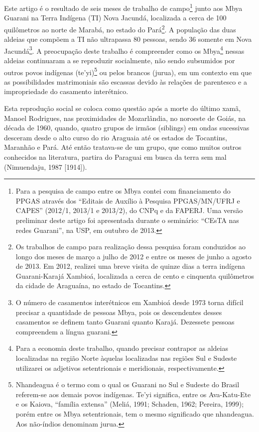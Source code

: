 \documentclass{article}
\begin{document}
Este artigo \'e o resultado de seis meses de trabalho de campo\footnote{
Para a pesquisa de campo entre os Mbya contei com financiamento do
PPGAS atrav\'es dos {\textquotedblleft}Editais de Aux\'ilio \`a
Pesquisa PPGAS/MN/UFRJ e CAPES{\textquotedblright} (2012/1, 2013/1 e
2013/2), do CNPq e da FAPERJ. Uma vers\~ao preliminar deste artigo foi
apresentada durante o semin\'ario: {\textquotedblleft}CEsTA nas redes
Guarani{\textquotedblright}, na USP, em outubro de 2013.} junto aos
Mbya Guarani na Terra Ind\'igena (TI) Nova Jacund\'a, localizada a
cerca de 100 quil\^ometros ao norte de Marab\'a, no estado do
Par\'a\footnote{ Os trabalhos de campo para realiza\c{c}\~ao dessa
pesquisa foram conduzidos ao longo dos meses de mar\c{c}o a julho de
2012 e entre os meses de junho a agosto de 2013. Em 2012, realizei uma
breve visita de quinze dias a terra ind\'igena Guarani-Karaj\'a
Xambio\'a, localizada a cerca de cento e cinquenta quil\^ometros da
cidade de Aragua\'ina, no estado de Tocantins.}. A popula\c{c}\~ao das
duas aldeias que comp\~oem a TI n\~ao ultrapassa 80 pessoas, sendo 36
somente em Nova Jacund\'a\footnote{ O n\'umero de casamentos
inter\'etnicos em Xambio\'a desde 1973 torna dif\'icil precisar a
quantidade de pessoas Mbya, pois os descendentes desses casamentos se
definem tanto Guarani quanto Karaj\'a. Dezessete pessoas compreendem a
l\'ingua guarani.}. A preocupa\c{c}\~ao deste trabalho \'e compreender
como os Mbya\footnote{ Para a economia deste trabalho, quando precisar
contrapor as aldeias localizadas na regi\~ao Norte \`aquelas
localizadas nas regi\~oes Sul e Sudeste utilizarei os adjetivos
setentrionais e meridionais, respectivamente.} nessas aldeias
continuaram a se reproduzir socialmente, n\~ao sendo subsumidos por
outros povos ind\'igenas (te{\textquoteright}yi)\footnote{ Nhandeagua
\'e o termo com o qual os Guarani no Sul e Sudeste do Brasil referem-se
aos demais povos ind\'igenas. Te{\textquoteright}yi significa, entre os
Ava-Katu-Ete e os Kaiova, {\textquotedblleft}fam\'ilia
extensa{\textquotedblright} (Meli\'a, 1991; Schaden, 1962; Pereira,
1999); por\'em entre os Mbya setentrionais, tem o mesmo significado que
nhandeagua. Aos n\~ao-\'indios denominam jurua.} ou pelos brancos
(jurua), em um contexto em que as possibilidades matrimoniais s\~ao
escassas devido \`as rela\c{c}\~oes de parentesco e a impropriedade do
casamento inter\'etnico.

Esta reprodu\c{c}\~ao social se coloca como quest\~ao ap\'os a morte do
\'ultimo xam\~a, Manoel Rodrigues, nas proximidades de Mozarl\^andia,
no noroeste de Goi\'as, na d\'ecada de 1960, quando, quatro grupos de
irm\~aos (siblings) em ondas sucessivas desceram desde o alto curso do
rio Araguaia at\'e os estados de Tocantins, Maranh\~ao e Par\'a. At\'e
ent\~ao tratava-se de um grupo, que como muitos outros conhecidos na
literatura, partira do Paraguai em busca da terra sem mal (Nimuendaju,
1987 [1914]).
\end{document}
